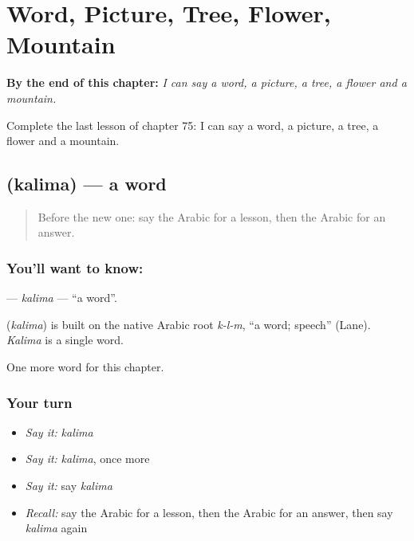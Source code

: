 
\chapter{Word, Picture, Tree, Flower, Mountain}
\label{ch:ar-word-picture-tree-flower-mountain}

\begin{chapteropening}
\textbf{By the end of this chapter:} \emph{I can say a word, a picture, a tree, a flower and a mountain.}

Complete the last lesson of chapter 75: I can say a word, a picture, a tree, a flower and a mountain.
\end{chapteropening}

\section[\texorpdfstring{\ar{كلمة} (kalima)}{كلمة (kalima)}]{ (kalima) — a word}

\label{lesson:AR-C75-kalima}



\begin{quote}
Before the new one: say the Arabic for a lesson, then the Arabic for an answer.
\end{quote}

\subsection*{You'll want to know: }
\textbf{} — \emph{kalima} — \textquotedblleft{}a word\textquotedblright{}.

\begin{cousinweb}
\textbf{} (\emph{kalima}) is built on the native Arabic root \emph{k-l-m}, \textquotedblleft{}a word; speech\textquotedblright{} (Lane). \emph{Kalima} is a single word.
\end{cousinweb}

\begin{grammarlens}[title={What you've built}]
One more word for this chapter.
\end{grammarlens}

\subsection*{Your turn}
\begin{itemize}
\raggedright
  \item \emph{Say it:} \emph{kalima}
  \item \emph{Say it:} \emph{kalima}, once more
  \item \emph{Say it:} say \emph{kalima}
  \item \emph{Recall:} say the Arabic for a lesson, then the Arabic for an answer, then say \emph{kalima} again
\end{itemize}

